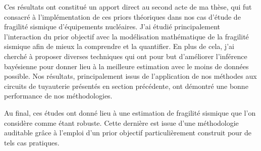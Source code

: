 \documentclass[a4paper]{book}
\renewcommand{\familydefault}{\sfdefault}
\begin{document}
Ces résultats ont constitué un apport direct au second acte de ma thèse, qui fut consacré à l'implémentation de ces priors théoriques dans nos cas d'étude de fragilité sismique d'équipements nucléaires. J'ai étudié principalement l'interaction du prior objectif avec la modélisation mathématique de la fragilité sismique afin de mieux la comprendre et la quantifier. En plus de cela, j'ai cherché à proposer diverses techniques qui ont pour but d'améliorer l'inférence bayésienne pour donner lieu à la meilleure estimation avec le moins de données possible. Nos résultats, principalement issus de l'application de nos méthodes aux circuits de tuyauterie présentés en section précédente, ont démontré une bonne performance de nos méthodologies. 

Au final, ces études ont donné lieu à une estimation de fragilité sismique que l'on considère comme étant robuste. Cette dernière est issue d'une méthodologie auditable grâce à l'emploi d'un prior objectif particulièrement construit pour de tels cas pratiques.

\newpage\thispagestyle{plain}


 

\printbibliography[heading=chapter,title=Bibliography]

\fancyhead{}
\newpage
\pagestyle{empty}
\backmatter
\ \cleardoublepage
\ \newpage
\renewcommand{\familydefault}{\sfdefault}
%
%
%
%
%
\end{document}
